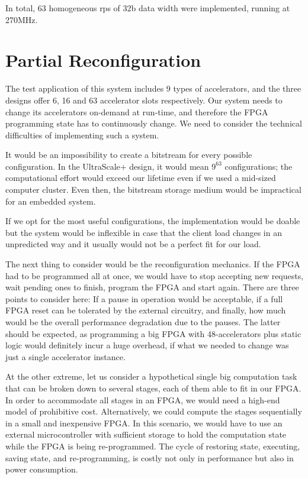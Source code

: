 In total, 63 homogeneous \glspl{rp} of 32b data width were implemented, running at 270MHz.

\section{Partial Reconfiguration}

The test application of this system includes 9 types of accelerators, and the three designs offer
6, 16 and 63 accelerator slots respectively. 
Our system needs to change its accelerators on-demand at run-time, 
and therefore the FPGA programming state has to continuously change.
We need to consider the technical difficulties of implementing such a system.

It would be an impossibility to create a bitstream for every possible configuration. In the UltraScale+ design,
it would mean $9^{63}$ configurations; the computational effort would exceed our lifetime even if we used
a mid-sized computer cluster. Even then, the bitstream storage medium would be impractical for an embedded system.

If we opt for the most useful configurations, the implementation would be doable but the system would
be inflexible in case that the client load changes in an unpredicted way and it usually would not be a perfect fit
for our load.

The next thing to consider would be the reconfiguration mechanics. 
If the FPGA had to be programmed all at once, we would have to 
stop accepting new requests, wait pending ones to finish, program the FPGA and start again.
There are three points to consider here: If a pause in operation would be acceptable, if a full FPGA reset
can be tolerated by the external circuitry,
and finally, how much would be the overall performance degradation due to the pauses.
The latter should be expected, as programming a big FPGA with 48-accelerators plus static logic 
would definitely incur a huge overhead, if what we needed to change was just a single accelerator instance.

At the other extreme, let us consider a hypothetical single big computation task
that can be broken down to several stages, each of them able to fit in our FPGA.
In order to accommodate all stages in an FPGA, we would need a high-end model of prohibitive cost.
Alternatively, we could compute the stages sequentially in a small and inexpensive FPGA.
In this scenario, we would have to use an external microcontroller with sufficient storage 
to hold the computation state while the FPGA is being re-programmed. 
The cycle of restoring state, executing, saving state, and re-programming,
is costly not only in performance but also in power consumption. 

